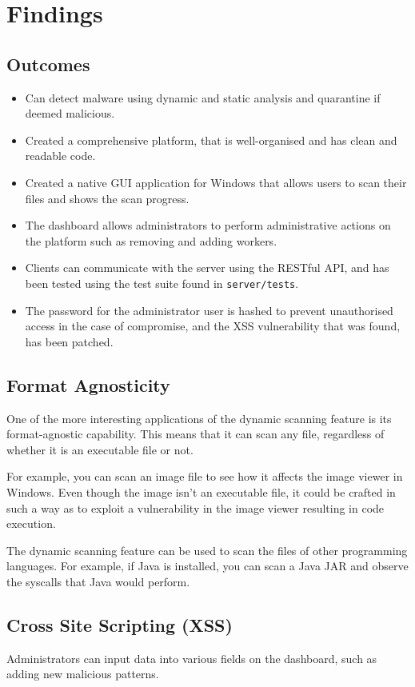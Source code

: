 \section{Findings}
\subsection{Outcomes}
\begin{itemize}
    \item Can detect malware using dynamic and static
    analysis and quarantine if deemed malicious.
    \item Created a comprehensive platform,
    that is well-organised and has clean and readable code.
    \item Created a native GUI application for Windows
    that allows users to scan their files and shows the scan progress.
    \item The dashboard allows administrators to perform administrative
    actions on the platform such as removing and adding workers.
    \item Clients can communicate with the server using the
    RESTful API, and has been tested using the test suite found in \texttt{server/tests}.
    \item The password for the administrator user is hashed to prevent
    unauthorised access in the case of compromise,
    and the XSS vulnerability that was found, has been patched.
\end{itemize}

\subsection{Format Agnosticity}
One of the more interesting applications of the
dynamic scanning feature is its format-agnostic capability.
This means that it can scan any file,
regardless of whether it is an executable file or not.

For example, you can scan an image file to see how
it affects the image viewer in Windows.
Even though the image isn't an executable file,
it could be crafted in such a way as to exploit
a vulnerability in the image viewer resulting in code execution.

The dynamic scanning feature can be used to scan
the files of other programming languages.
For example, if Java is installed, you can scan a Java JAR
and observe the syscalls that Java would perform.

\subsection{Cross Site Scripting (XSS)}
Administrators can input data into various fields on the dashboard,
such as adding new malicious patterns.

